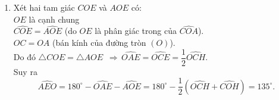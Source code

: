 \begin{ex}
{\begin{enumerate}
			mà $\widehat{ACH}=\widehat{CBA}$ (cùng phụ với góc $\widehat{ACB}$).
			Suy ra $\widehat{ACJ}=\widehat{CBK}$.\\
			Mặt khác, ta lại có $\widehat{CIM}=\widehat{ICB}+\widehat{CBK}$.\\
			Trong tam giác $CMI$, ta có \[\widehat{MCI}+\widehat{CIM}=\widehat{MCI}+\widehat{ICB}+\widehat{CBK}=\widehat{ACJ}+\widehat{MCI}+\widehat{ICB}=\widehat{ACB}=90^\circ.\]
			Suy ra $\widehat{CMI}=90^\circ$, hay $KI \perp CJ$.\\
			Tương tự ta cũng chứng minh được $JI \perp CK$. Vậy $I$ là trực tâm của tam giác $CJK$.
			\item Xét hai tam giác $COE$ và $AOE$ có:\\
			$OE$ là cạnh chung\\
			$\widehat{COE}=\widehat{AOE}$ (do $OE$ là phân giác trong của $\widehat{COA}$).\\
			$OC=OA$ (bán kính của đường tròn $(O)$).\\
			Do đó $\triangle{COE}=\triangle{AOE}$ $\,\Rightarrow\, \widehat{OAE}=\widehat{OCE}=\dfrac{1}{2}\widehat{OCH}$.\\
			Suy ra
			\[\widehat{AEO}=180^\circ-\widehat{OAE}-\widehat{AOE}=180^\circ-\dfrac{1}{2}\left(\widehat{OCH}+\widehat{COH}\right)=135^\circ.\]
		\end{enumerate}
	}
\end{ex}
